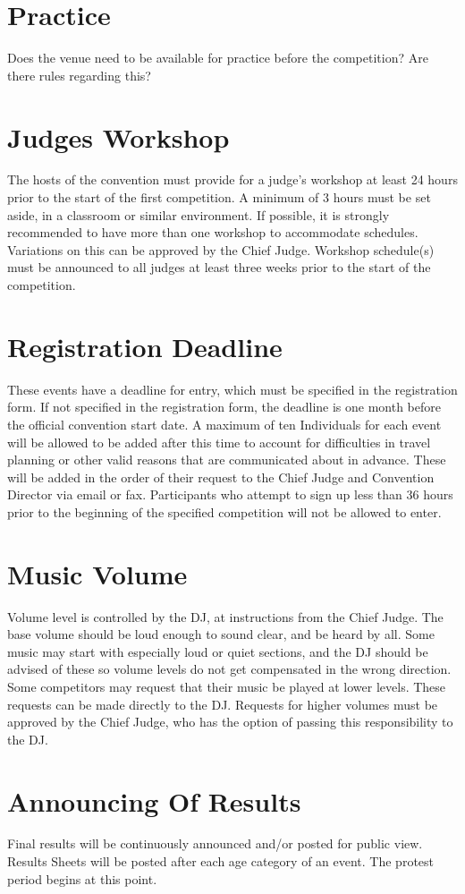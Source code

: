 \section{Practice}

\begin{framed}
Does the venue need to be available for practice before the competition? Are there rules regarding this?
\end{framed}

\section{Judges Workshop}
The hosts of the convention must provide for a judge's workshop at least 24 hours prior to the start of the first competition.
A minimum of 3 hours must be set aside, in a classroom or similar environment.
If possible, it is strongly recommended to have more than one workshop to accommodate schedules.
Variations on this can be approved by the Chief Judge.
Workshop schedule(s) must be announced to all judges at least three weeks prior to the start of the competition.

\section{Registration Deadline}

These events have a deadline for entry, which must be specified in the registration form.
If not specified in the registration form, the deadline is one month before the official convention start date.
A maximum of ten Individuals for each event will be allowed to be added after this time to account for difficulties in travel planning or other valid reasons that are communicated about in advance.
These will be added in the order of their request to the Chief Judge and Convention Director via email or fax.
Participants who attempt to sign up less than 36 hours prior to the beginning of the specified competition will not be allowed to enter.

\section{Music Volume}
Volume level is controlled by the DJ, at instructions from the Chief Judge.
The base volume should be loud enough to sound clear, and be heard by all.
Some music may start with especially loud or quiet sections, and the DJ should be advised of these so volume levels do not get compensated in the wrong direction.
Some competitors may request that their music be played at lower levels.
These requests can be made directly to the DJ.
Requests for higher volumes must be approved by the Chief Judge, who has the option of passing this responsibility to the DJ.

\section{Announcing Of Results}
Final results will be continuously announced and/or posted for public view.
Results Sheets will be posted after each age category of an event.
The protest period begins at this point.
